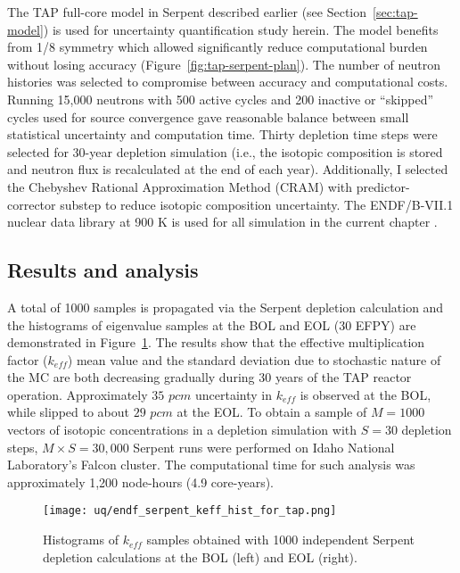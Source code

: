 The \gls{TAP} full-core model in Serpent described earlier (see  
Section~\ref{sec:tap-model}) is used for uncertainty quantification study 
herein. The model benefits from 1/8 symmetry which allowed significantly 
reduce computational burden without losing accuracy 
(Figure~\ref{fig:tap-serpent-plan}). The number of neutron histories was 
selected to compromise between accuracy and computational costs. Running 
15,000 neutrons with 500 active cycles and 200 inactive or “skipped” cycles 
used for source convergence gave reasonable balance between small statistical 
uncertainty and computation time. Thirty depletion time steps were selected 
for 30-year depletion simulation (i.e., the isotopic composition is stored and 
neutron flux is recalculated at the end of each year). Additionally, I selected
the Chebyshev Rational Approximation Method (CRAM) with predictor-corrector 
substep \cite{pusa_computing_2010} to reduce isotopic composition uncertainty.
The ENDF/B-VII.1 nuclear data library at 900 K is used for all simulation in 
the current chapter \cite{chadwick_endf/b-vii.1_2011}.

\subsection{Results and analysis}
A total of 1000 samples is propagated via the Serpent depletion calculation 
and the histograms of eigenvalue samples at the \gls{BOL} and \gls{EOL} (30 
\gls{EFPY}) are demonstrated in Figure~\ref{fig:uq-serp-keff-hist}. The 
results show that the effective multiplication factor ($k_{eff}$) mean value 
and the standard deviation due to stochastic nature of the \gls{MC} are both 
decreasing gradually during 30 years of the \gls{TAP} reactor operation. 
Approximately $35$ $pcm$ uncertainty in $k_{eff}$ is observed at the 
\gls{BOL}, while slipped to about $29$ $pcm$ at the \gls{EOL}. To obtain 
a sample of $M=1000$ vectors of isotopic concentrations in a depletion 
simulation with $S=30$ depletion steps, $M\times S=30,000$ Serpent runs were 
performed on Idaho National Laboratory's Falcon cluster. The computational 
time for such analysis was approximately 1,200 node-hours (4.9 core-years).
\begin{figure}[htp!] %
	\centering
	\texttt{[image: uq/endf\_serpent\_keff\_hist\_for\_tap.png]}
		\vspace{-4mm}
	\caption{Histograms of $k_{eff}$ samples obtained with 1000 independent 
	Serpent depletion calculations at the \gls{BOL} (left) and \gls{EOL} 
	(right).}
	\label{fig:uq-serp-keff-hist}
\end{figure}

